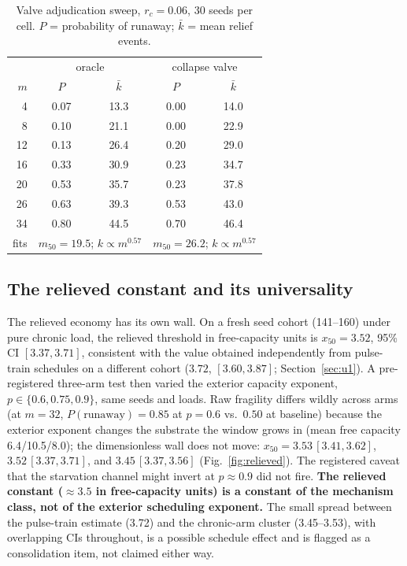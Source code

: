 \documentclass[11pt]{article}
\begin{document}
\begin{table}[t]
\centering\small
\begin{tabular}{r cc cc}
\toprule
 & \multicolumn{2}{c}{oracle} & \multicolumn{2}{c}{collapse valve}\\
$m$ & $P$ & $\bar k$ & $P$ & $\bar k$\\
\midrule
4  & 0.07 & 13.3 & 0.00 & 14.0\\
8  & 0.10 & 21.1 & 0.00 & 22.9\\
12 & 0.13 & 26.4 & 0.20 & 29.0\\
16 & 0.33 & 30.9 & 0.23 & 34.7\\
20 & 0.53 & 35.7 & 0.23 & 37.8\\
26 & 0.63 & 39.3 & 0.53 & 43.0\\
34 & 0.80 & 44.5 & 0.70 & 46.4\\
\midrule
fits & \multicolumn{2}{c}{$m_{50}=19.5$; $k\propto m^{0.57}$} &
       \multicolumn{2}{c}{$m_{50}=26.2$; $k\propto m^{0.57}$}\\
\bottomrule
\end{tabular}
\caption{Valve adjudication sweep, $r_c=0.06$, 30 seeds per cell. $P$ =
probability of runaway; $\bar k$ = mean relief events.}
\label{tab:adjud}
\end{table}

\subsection{The relieved constant and its universality}\label{sec:u4r}
The relieved economy has its own wall. On a fresh seed cohort (141--160) under
pure chronic load, the relieved threshold in free-capacity units is
$x_{50}=3.52$, 95\% CI $[3.37,3.71]$, consistent with the value obtained
independently from pulse-train schedules on a different cohort
($3.72$, $[3.60,3.87]$; Section~\ref{sec:u1}). A pre-registered three-arm test
then varied the exterior capacity exponent, $p\in\{0.6,0.75,0.9\}$, same
seeds and loads. Raw fragility differs wildly across arms (at $m=32$,
$P(\text{runaway})=0.85$ at $p=0.6$ vs.\ $0.50$ at baseline) because the
exterior exponent changes the substrate the window grows in (mean free
capacity 6.4/10.5/8.0); the dimensionless wall does not move:
$x_{50}=3.53\,[3.41,3.62]$, $3.52\,[3.37,3.71]$, and $3.45\,[3.37,3.56]$
(Fig.~\ref{fig:relieved}). The registered caveat that the starvation channel
might invert at $p\approx0.9$ did not fire. \textbf{The relieved constant
(${\approx}3.5$ in free-capacity units) is a constant of the mechanism class,
not of the exterior scheduling exponent.} The small spread between the
pulse-train estimate (3.72) and the chronic-arm cluster (3.45--3.53), with
overlapping CIs throughout, is a possible schedule effect and is flagged as a
consolidation item, not claimed either way.
\end{document}
